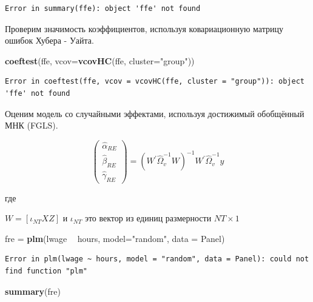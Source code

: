 \documentclass[]{book}
\newenvironment{Shaded}{\begin{snugshade}}{\end{snugshade}}
\newcommand{\DataTypeTok}[1]{\textcolor[rgb]{0.13,0.29,0.53}{#1}}
\newcommand{\KeywordTok}[1]{\textcolor[rgb]{0.13,0.29,0.53}{\textbf{#1}}}
\newcommand{\NormalTok}[1]{#1}
\newcommand{\OperatorTok}[1]{\textcolor[rgb]{0.81,0.36,0.00}{\textbf{#1}}}
\newcommand{\StringTok}[1]{\textcolor[rgb]{0.31,0.60,0.02}{#1}}
\begin{document}
\begin{verbatim}
Error in summary(ffe): object 'ffe' not found
\end{verbatim}

Проверим значимость коэффициентов, используя ковариационную матрицу ошибок Хубера - Уайта.

\begin{Shaded}
\begin{Highlighting}[]
\KeywordTok{coeftest}\NormalTok{(ffe, }\DataTypeTok{vcov=}\KeywordTok{vcovHC}\NormalTok{(ffe, }\DataTypeTok{cluster=}\StringTok{"group"}\NormalTok{))}
\end{Highlighting}
\end{Shaded}

\begin{verbatim}
Error in coeftest(ffe, vcov = vcovHC(ffe, cluster = "group")): object 'ffe' not found
\end{verbatim}

Оценим модель со случайными эффектами, используя достижимый обобщённый МНК (FGLS).

\begin{equation}
\left(\begin{array}{c}{\widehat{\alpha}_{R E}} \\ {\widehat{\beta}_{R E}} \\ {\widehat{\gamma}_{R E}}\end{array}\right)=\left(W^{\prime} \widehat{\Omega}_{v}^{-1} W\right)^{-1} W^{\prime} \widehat{\Omega}_{v}^{-1} y
\end{equation}

где

\(W=\left[\iota_{N T} X Z\right] \text { и } \iota_{N T} \text { это вектор из единиц размерности } N T \times 1\)

\begin{Shaded}
\begin{Highlighting}[]
\NormalTok{fre =}\StringTok{ }\KeywordTok{plm}\NormalTok{(lwage }\OperatorTok{~}\StringTok{ }\NormalTok{hours, }\DataTypeTok{model=}\StringTok{"random"}\NormalTok{, }\DataTypeTok{data =}\NormalTok{ Panel)}
\end{Highlighting}
\end{Shaded}

\begin{verbatim}
Error in plm(lwage ~ hours, model = "random", data = Panel): could not find function "plm"
\end{verbatim}

\begin{Shaded}
\begin{Highlighting}[]
\KeywordTok{summary}\NormalTok{(fre)}
\end{Highlighting}
\end{Shaded}
\end{document}
